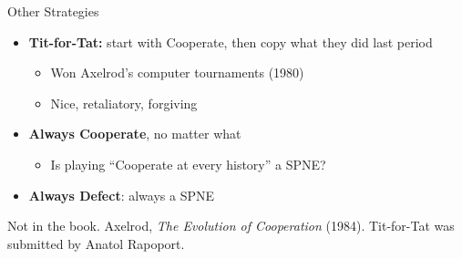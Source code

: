 
\begin{frame}{Other Strategies}
\begin{itemize}
    \item \textbf{Tit-for-Tat:} start with Cooperate, then copy what they did last period
    \begin{itemize}
        \item Won Axelrod's computer tournaments (1980)
        \item Nice, retaliatory, forgiving
    \end{itemize}
    \item \textbf{Always Cooperate}, no matter what
    \begin{itemize}
        \item Is playing ``Cooperate at every history'' a SPNE? \underline{\hspace{0.8in}}
    \end{itemize}
    \item \textbf{Always Defect}: always a SPNE
\end{itemize}
\bsk
{}
\vfill
{\footnotesize Not in the book. Axelrod, \textit{The Evolution of Cooperation} (1984). Tit-for-Tat was submitted by Anatol Rapoport.}
\vspace{-0.2in}
\end{frame}

